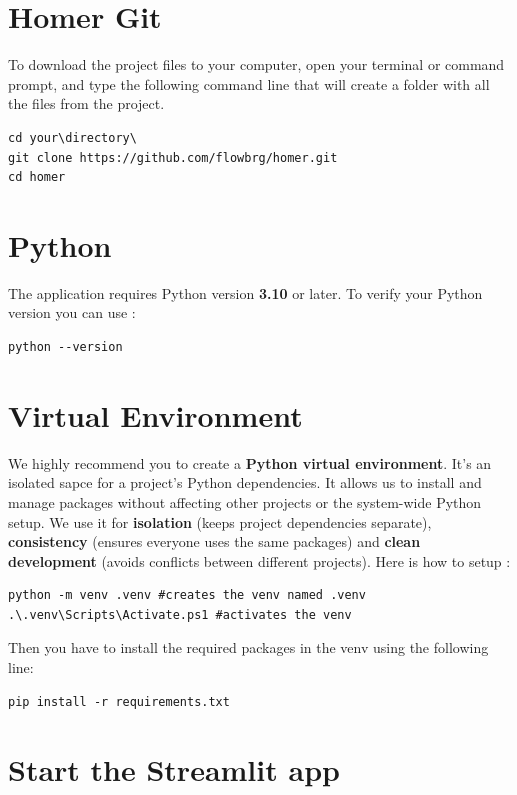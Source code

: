 \documentclass[11pt,a4paper]{report}
\begin{document}
\section{Homer Git}

To download the project files to your computer, open your terminal or command prompt, and type the following command line that will create a folder with all the files from the project. 

\begin{lstlisting}
cd your\directory\
git clone https://github.com/flowbrg/homer.git
cd homer
\end{lstlisting}

\section{Python}

The application requires Python version \textbf{3.10} or later. To verify your Python version you can use : 
\begin{lstlisting}
python --version
\end{lstlisting}


\section{Virtual Environment}

We highly recommend you to create a \textbf{Python virtual environment}. It's an isolated sapce for a project's Python dependencies. It allows us to install and manage packages without affecting other projects or the system-wide Python setup. We use it for \textbf{isolation} (keeps project dependencies separate), \textbf{consistency} (ensures everyone uses the same packages) and \textbf{clean development} (avoids conflicts between different projects). 
Here is how to setup : 
\begin{lstlisting}
python -m venv .venv #creates the venv named .venv
.\.venv\Scripts\Activate.ps1 #activates the venv
\end{lstlisting}

Then you have to install the required packages in the venv using the following line: 

\begin{lstlisting}
pip install -r requirements.txt
\end{lstlisting}

\section{Start the Streamlit app}
\end{document}
